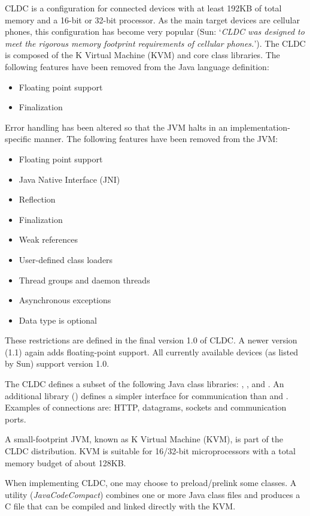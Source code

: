 CLDC is a configuration for connected devices with at least 192KB of
total memory and a 16-bit or 32-bit processor. As the main target
devices are cellular phones, this configuration has become very
popular (Sun: `\textit{CLDC was designed to meet the rigorous memory
footprint requirements of cellular phones.}'). The CLDC is composed
of the K Virtual Machine (KVM) and core class libraries. The
following features have been removed from the Java language
definition:
%
\begin{itemize}
    \item Floating point support
    \item Finalization
\end{itemize}
%
Error handling has been altered so that the JVM halts in an
implementation-specific manner. The following features have been
removed from the JVM:
%
\begin{itemize}
    \item Floating point support
    \item Java Native Interface (JNI)
    \item Reflection
    \item Finalization
    \item Weak references
    \item User-defined class loaders
    \item Thread groups and daemon threads
    \item Asynchronous exceptions
    \item Data type  is optional
\end{itemize}
%
These restrictions are defined in the final version 1.0 of CLDC. A
newer version (1.1) again adds floating-point support. All currently
available devices (as listed by Sun) support version 1.0.

The CLDC defines a subset of the following Java class libraries:
, ,  and
. An additional library
() defines a simpler
interface for communication than  and .
Examples of connections are: HTTP, datagrams, sockets and
communication ports.

A small-footprint JVM, known as K Virtual Machine (KVM), is part of
the CLDC distribution. KVM is suitable for 16/32-bit microprocessors
with a total memory budget of about 128KB.

When implementing CLDC, one may choose to preload/prelink some
classes. A utility (\textit{JavaCodeCompact}) combines one or more
Java class files and produces a C file that can be compiled and
linked directly with the KVM.

